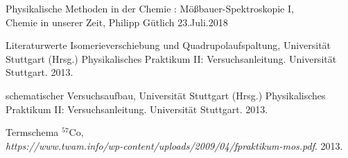 \documentclass[10pt,twoside]{article}
\renewcommand{\1}{^{-1}}
\renewcommand{\2}{^{-2}}
\newcommand{\3}{^{-3}}
\newcommand{\4}{^{-4}}
\newcommand{\5}{^{-5}}
\newcommand{\6}{^{-6}}
\newcommand{\7}{^{-7}}
\newcommand{\8}{^{-8}}
\newcommand{\9}{^{-9}}
\begin{document}
\renewcommand{\refname}{\textbf{Literaturverzeichnis}}
\begin{thebibliography}{xx}

\glqq Physikalische Methoden in der Chemie :
Mößbauer-Spektroskopie I\grqq ,\\
Chemie in unserer Zeit, Philipp Gütlich 
 	23.Juli.2018
 	
 	
\glqq Literaturwerte Isomerieverschiebung und Quadrupolaufspaltung\grqq ,
Universität Stuttgart (Hrsg.) Physikalisches Praktikum II: Versuchsanleitung. Universität Stuttgart.
2013.

\glqq schematischer Versuchsaufbau\grqq ,
Universität Stuttgart (Hrsg.) Physikalisches Praktikum II: Versuchsanleitung. Universität Stuttgart.
2013.

\glqq Termschema $^{57}$Co\grqq , \\
\emph{https://www.twam.info/wp-content/uploads/2009/04/fpraktikum-mos.pdf}.
2013.

\end{thebibliography}
\end{document}
